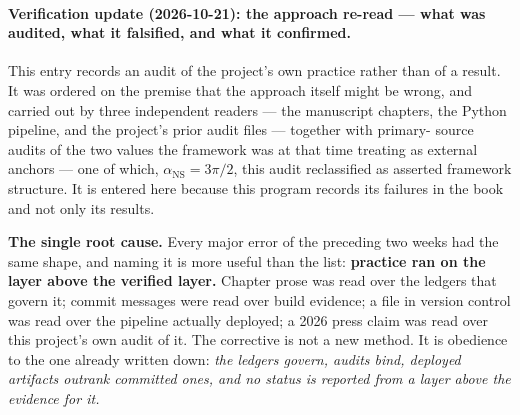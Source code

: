 \paragraph{Verification update (2026-10-21): the approach re-read --- what was
audited, what it falsified, and what it confirmed.}
This entry records an audit of the project's own practice rather than of a
result. It was ordered on the premise that the approach itself might be wrong,
and carried out by three independent readers --- the manuscript chapters, the
Python pipeline, and the project's prior audit files --- together with primary-
source audits of the two values the framework was at that time
treating as external anchors --- one of which, $\alpha_{\text{NS}} = 3\pi/2$,
this audit reclassified as asserted framework structure. It is entered
here because this program records its failures in the book and not only its
results.

\noindent\textbf{The single root cause.} Every major error of the preceding two
weeks had the same shape, and naming it is more useful than the list:
\textbf{practice ran on the layer above the verified layer.} Chapter prose was
read over the ledgers that govern it; commit messages were read over build
evidence; a file in version control was read over the pipeline actually
deployed; a 2026 press claim was read over this project's own audit of it. The
corrective is not a new method. It is obedience to the one already written
down: \emph{the ledgers govern, audits bind, deployed artifacts outrank
committed ones, and no status is reported from a layer above the evidence for
it.}

